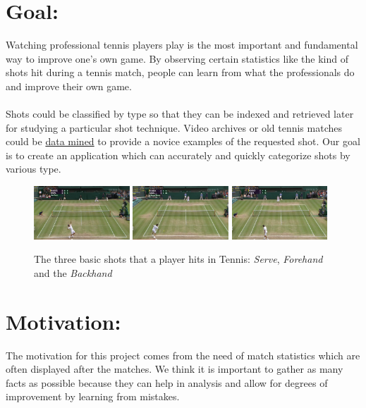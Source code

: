 \documentclass[10.5pt]{article}
\begin{document}
    \section{Goal:}
    Watching professional tennis players play is the most important and fundamental way to improve one's own game. By observing certain statistics like the kind of shots hit during a tennis match, people can learn from what the professionals do and improve their own game.\\
    \\
    Shots could be classified by type so that they can be indexed and retrieved later for studying a particular shot technique. Video archives or old tennis matches could be \underline{data mined} to provide a novice examples of the requested shot. Our goal is to create an application which can accurately and quickly categorize shots by various type.
    \begin{figure}[h]
    \centering
    \includegraphics[width=0.32\textwidth]{serve.png}
    \includegraphics[width=0.32\textwidth]{forehand.png}
    \includegraphics[width=0.32\textwidth]{backhand.png}
    \caption{The three basic shots that a player hits in Tennis: \textit{Serve}, \textit{Forehand} and the \textit{Backhand}}
    \end{figure}
    
    \section{Motivation:}
    The motivation for this project comes from the need of match statistics which are often displayed after the matches. We think it is important to gather as many facts as possible because they can help in analysis and allow for degrees of improvement by learning from mistakes.
    
\end{document}
